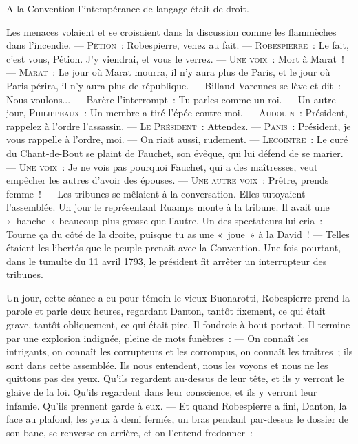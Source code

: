\documentclass[french,twoside]{book} %
\begin{document}
A la Convention l’intempérance de langage était de droit.\par
Les menaces volaient et se croisaient dans la discussion comme les flammèches dans l’incendie. — P{\scshape étion} : Robespierre, venez au fait. — R{\scshape obespierre} :  Le fait, c’est vous, Pétion. J’y viendrai, et vous le verrez. — U{\scshape ne voix} : Mort à Marat ! — M{\scshape arat} : Le jour où Marat mourra, il n’y aura plus de Paris, et le jour où Paris périra, il n’y aura plus de république. — Billaud-Varennes se lève et dit : Nous voulons... — Barère l’interrompt : Tu parles comme un roi. — Un autre jour, P{\scshape hilippeaux} : Un membre a tiré l’épée contre moi. — A{\scshape udouin} : Président, rappelez à l’ordre l’assassin. — L{\scshape e} P{\scshape résident} : Attendez. — P{\scshape anis} : Président, je vous rappelle à l’ordre, moi. — On riait aussi, rudement. — L{\scshape ecointre} : Le curé du Chant-de-Bout se plaint de Fauchet, son évêque, qui lui défend de se marier. — U{\scshape ne voix} : Je ne vois pas pourquoi Fauchet, qui a des maîtresses, veut empêcher les autres d’avoir des épouses. — U{\scshape ne autre voix} : Prêtre, prends femme ! — Les tribunes se mêlaient à la conversation. Elles tutoyaient l’assemblée. Un jour le représentant Ruamps monte à la tribune. Il avait une « hanche » beaucoup plus grosse que l’autre. Un des spectateurs lui cria : — Tourne ça du côté de la droite, puisque tu as une « joue » à la David ! — Telles étaient les libertés que le peuple prenait avec la Convention. Une fois pourtant, dans le tumulte du 11 avril 1793, le président fit arrêter un interrupteur des tribunes.\par
Un jour, cette séance a eu pour témoin le vieux Buonarotti, Robespierre prend la parole et parle deux heures, regardant Danton, tantôt fixement, ce qui était grave, tantôt obliquement, ce qui était pire. Il foudroie à bout portant. Il termine par une explosion indignée, pleine de mots funèbres : — On connaît les  intrigants, on connaît les corrupteurs et les corrompus, on connaît les traîtres ; ils sont dans cette assemblée. Ils nous entendent, nous les voyons et nous ne les quittons pas des yeux. Qu’ils regardent au-dessus de leur tête, et ils y verront le glaive de la loi. Qu’ils regardent dans leur conscience, et ils y verront leur infamie. Qu’ils prennent garde à eux. — Et quand Robespierre a fini, Danton, la face au plafond, les yeux à demi fermés, un bras pendant par-dessus le dossier de son banc, se renverse en arrière, et on l’entend fredonner :\par
\end{document}
